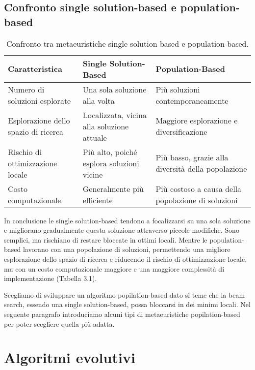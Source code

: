 \subsection{Confronto single solution-based e population-based}

\begin{table}[h!]
    \centering
    \renewcommand{\arraystretch}{1.7}
    \begin{tabular}{|>{\raggedright\arraybackslash}p{4cm}|>{\raggedright\arraybackslash}p{4cm}|>{\raggedright\arraybackslash}p{4cm}|}
    \hline
    \textbf{Caratteristica} & \textbf{Single Solution-Based} & \textbf{Population-Based} \\ \hline
    Numero di soluzioni esplorate & Una sola soluzione alla volta & Più soluzioni contemporaneamente \\ \hline
    Esplorazione dello spazio di ricerca & Localizzata, vicina alla soluzione attuale & Maggiore esplorazione e diversificazione \\ \hline
    Rischio di ottimizzazione locale & Più alto, poiché esplora soluzioni vicine & Più basso, grazie alla diversità della popolazione \\ \hline
    Costo computazionale & Generalmente più efficiente & Più costoso a causa della popolazione di soluzioni \\ \hline
    \end{tabular}
    \caption{Confronto tra metaeuristiche single solution-based e population-based.}
    \label{tab:comparison}
\end{table}

In conclusione le single solution-based tendono a focalizzarsi su una sola soluzione e migliorano gradualmente questa soluzione attraverso piccole modifiche. Sono semplici, ma rischiano di restare bloccate in ottimi locali. Mentre le population-based lavorano con una popolazione di soluzioni, permettendo una migliore esplorazione dello spazio di ricerca e riducendo il rischio di ottimizzazione locale, ma con un costo computazionale maggiore e una maggiore complessità di implementazione (Tabella 3.1).

Scegliamo di sviluppare un algoritmo popilation-based dato si teme che la beam search, essendo una single solution-based, possa bloccarsi in dei minimi locali. Nel seguente paragrafo introduciamo alcuni tipi di metaeuristiche popilation-based per poter scegliere quella più adatta.

\section{Algoritmi evolutivi}

